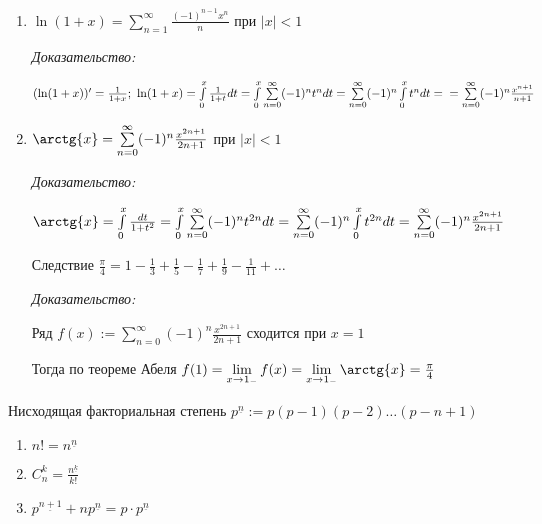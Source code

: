 \documentclass[12pt]{article}
\begin{document}
\begin{Remark}{}
    \begin{enumerate}
        \item $\ln(1 + x) = \sum\limits_{n = 1}^\infty \frac{(-1)^{n - 1} x^n}{n}$ при $|x| < 1$
        
        \textit{Доказательство:} 
        
        $(\ln(1 + x))' = \frac{1}{1 + x};\ \ln(1 + x) = \int\limits_0^x \frac{1}{1 + t}dt = \int\limits_0^x \sum\limits_{n = 0}^\infty (-1)^n t^n dt = \sum\limits_{n = 0}^\infty (-1)^n \int\limits_0^x t^n dt = \\ = \sum\limits_{n = 0}^\infty (-1)^n \frac{x^{n + 1}}{n + 1}$

        \item $\arctg{x} = \sum\limits_{n = 0}^\infty (-1)^n \frac{x^{2n + 1}}{2n + 1}$ при $|x| < 1$
        
        \textit{Доказательство:}

        $\arctg{x} = \int\limits_0^x \frac{dt}{1 + t^2} = \int\limits_0^x \sum\limits_{n = 0}^\infty (-1)^n t^{2n} dt = \sum\limits_{n = 0}^\infty (-1)^n \int\limits_0^x t^{2n} dt = \sum\limits_{n = 0}^\infty (-1)^n \frac{x^{2n + 1}}{2n + 1}$

        \begin{theo}{Следствие}
            $\frac{\pi}{4} = 1 - \frac{1}{3} + \frac{1}{5} - \frac{1}{7} + \frac{1}{9} - \frac{1}{11} + \ldots$
        \end{theo}

        \textit{Доказательство:}

        Ряд $f(x) := \sum\limits_{n = 0}^\infty (-1)^n \frac{x^{2n + 1}}{2n + 1}$ сходится при $x = 1$

        Тогда по теореме Абеля $f(1) = \lim\limits_{x \to 1_-} f(x) = \lim\limits_{x \to 1_-} \arctg{x} = \frac{\pi}{4}$
    \end{enumerate}
\end{Remark}

\begin{defin}{Нисходящая факториальная степень}
    $p^{\underline{n}} := p(p - 1)(p - 2) \ldots (p - n + 1)$
\end{defin}

\begin{Remark}{}
    \begin{enumerate}
        \item $n! = n^{\underline{n}}$
        \item $C_n^k = \frac{n^{\underline{k}}}{k!}$
        \item $p^{\underline{n + 1}} + np^{\underline{n}} = p \cdot p^{\underline{n}}$
    \end{enumerate}
\end{Remark}
\end{document}
